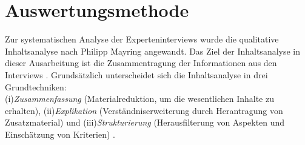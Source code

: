 \section{Auswertungsmethode}
Zur systematischen Analyse der Experteninterviews wurde die qualitative Inhaltsanalyse nach Philipp Mayring angewandt. Das Ziel der Inhaltsanalyse in dieser Ausarbeitung ist die Zusammentragung der Informationen aus den Interviews \cite{mayring1994qualitative}. Grundsätzlich unterscheidet sich die Inhaltsanalyse in drei Grundtechniken: \\(i)\emph{Zusammenfassung} (Materialreduktion, um die wesentlichen Inhalte zu erhalten), (ii)\emph{Explikation} (Verständniserweiterung durch Herantragung von Zusatzmaterial) und (iii)\emph{Strukturierung} (Herausfilterung von Aspekten und Einschätzung von Kriterien) \cite{mayring1994qualitative}.\\
